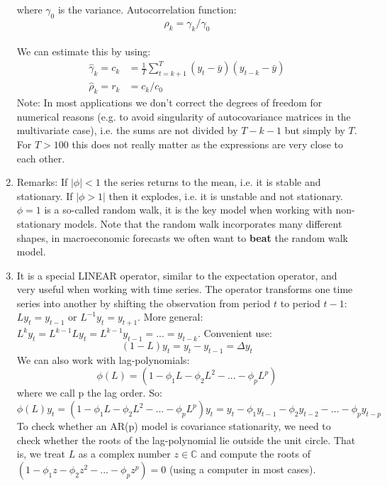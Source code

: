 \begin{enumerate}
where $\gamma_0$ is the variance. Autocorrelation function: $$\rho_k = \gamma_k/\gamma_0$$
\\	
We can estimate this by using:
\begin{align*}
    \hat{\gamma}_k = c_k &= \frac{1}{T} \sum_{t=k+1}^T(y_t -\bar{y})(y_{t-k}-\bar{y})\\
    \hat{\rho}_k = r_k & = c_k/c_0
    \end{align*}
Note: In most applications we don't correct the degrees of freedom for numerical reasons
  (e.g. to avoid singularity of autocovariance matrices in the multivariate case),
  i.e. the sums are not divided by $T-k-1$ but simply by $T$.
For $T>100$ this does not really matter as the expressions are very close to each other.

\item 
Remarks: If $|\phi|<1$ the series returns to the mean, i.e. it is stable and stationary.
If $|\phi>1|$ then it explodes, i.e. it is unstable and not stationary.
$\phi=1$ is a so-called random walk,
  it is the key model when working with non-stationary models.
Note that the random walk incorporates many different shapes, in macroeconomic forecasts we often want to \textbf{beat} the random walk model.
\item It is a special LINEAR operator, similar to the expectation operator, and very useful when working with time series.
The operator transforms one time series into another by shifting the observation from period $t$ to period $t-1$:
$Ly_t = y_{t-1}$ or $L^{-1} y_t =y_{t+1}$.
More general: $L^k y_t = L^{k-1} L y_t = L^{k-1} y_{t-1} = ... = y_{t-k}$.
Convenient use:
$$(1-L)y_t = y_t - y_{t-1}= \Delta y_t$$
We can also work with lag-polynomials:
$$ \phi(L) = (1-\phi_1 L-\phi_2 L^2 -... - \phi_p L^p)$$
where we call p the lag order. So:
$$ \phi(L) y_t = (1-\phi_1 L-\phi_2 L^2 -... - \phi_p L^p)y_t = y_t - \phi_1 y_{t-1} -\phi_2 y_{t-2} - ... - \phi_p y_{t-p}$$
To check whether an AR(p) model is covariance stationarity, we need to check whether the roots of the lag-polynomial lie outside the unit circle.
That is, we treat $L$ as a complex number $z\in \mathbb{C}$ and compute the roots of $(1-\phi_1 z-\phi_2 z^2 -... - \phi_p z^p)=0$ (using a computer in most cases).
\end{enumerate}